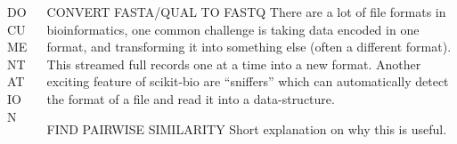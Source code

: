 \documentclass[final,t]{beamer}
\begin{document}
\begin{frame}{}
\begin{columns}[t]
\begin{column}{.3\linewidth}
\begin{block}{\uppercase{Documentation}}
        \end{block}

    \end{column}


    \begin{column}{.3\linewidth}


          \begin{block}{\uppercase{Convert Fasta/Qual to FastQ}}
            There are a lot of file formats in bioinformatics, one common challenge is taking data encoded in one format, and transforming it into something else (often a different format).
            \newline\newline
            \newline
            This streamed full records one at a time into a new format.\newline\newline
            Another exciting feature of scikit-bio are ``sniffers'' which can automatically detect the format of a file and read it into a data-structure.

          \end{block}


          \begin{block}{\uppercase{Find Pairwise Similarity}}
            Short explanation on why this is useful.
            \newline\newline
            \newline\newline
          \end{block}


\end{column}
\end{columns}
\end{frame}
\end{document}
